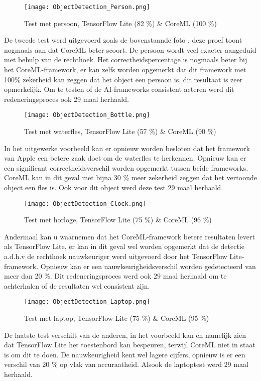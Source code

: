 \begin{figure}[H]
	\centering
	\texttt{[image: ObjectDetection\_Person.png]}
	\caption{Test met persoon, TensorFlow Lite (82 \%) \& CoreML (100 \%)}
\end{figure}
De tweede test werd uitgevoerd zoals de bovenstaande foto , deze proef toont nogmaals aan dat CoreML beter scoort. De persoon wordt veel exacter aangeduid met behulp van de rechthoek. Het correctheidspercentage is nogmaals beter bij het CoreML-framework, er kan zelfs worden opgemerkt dat dit framework met 100\% zekerheid kan zeggen dat het object een persoon is, dit resultaat is zeer opmerkelijk. Om te testen of de AI-frameworks consistent acteren werd dit redeneringsproces ook 29 maal herhaald.

\begin{figure}[H]
	\centering
	\texttt{[image: ObjectDetection\_Bottle.png]}
	\caption{Test met waterfles, TensorFlow Lite (57 \%) \& CoreML (90 \%)}
\end{figure}
In het uitgewerke voorbeeld kan er opnieuw worden besloten dat het framework van Apple een betere zaak doet om de waterfles te herkennen. Opnieuw kan er een significant correctheidsverschil worden opgemerkt tussen beide frameworks. CoreML kan in dit geval met bijna 30 \% meer zekerheid zeggen dat het vertoonde object een fles is. Ook voor dit object werd deze test 29 maal herhaald.
\begin{figure}[H]
	\centering
	\texttt{[image: ObjectDetection\_Clock.png]}
	\caption{Test met horloge, TensorFlow Lite (75 \%) \& CoreML (96 \%)}
\end{figure}
Andermaal kan u waarnemen dat het CoreML-framework betere resultaten levert als TensorFlow Lite, er kan in dit geval wel worden opgemerkt dat de detectie a.d.h.v de rechthoek nauwkeuriger werd uitgevoerd door het TensorFlow Lite-framework. Opnieuw kan er een nauwkeurigheidsverschil worden gedetecteerd van meer dan 20 \%. Dit redeneringsproces werd ook 29 maal herhaald om te achterhalen of de resultaten wel consistent zijn.

\begin{figure}[H]
	\centering
	\texttt{[image: ObjectDetection\_Laptop.png]}
	\caption{Test met laptop, TensorFlow Lite (75 \%) \& CoreML (95 \%)}
\end{figure}
De laatste test verschilt van de anderen, in het voorbeeld kan en namelijk zien dat TensorFlow Lite het toestenbord kan bespeuren, terwijl CoreML niet in staat is om dit te doen. De nauwkeurigheid kent wel lagere cijfers, opnieuw is er een verschil van 20 \% op vlak van accuraatheid. Alsook de laptoptest werd 29 maal herhaald. 
	

